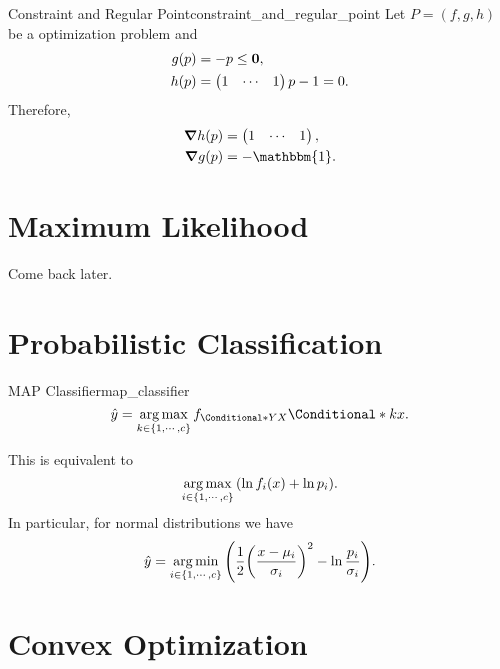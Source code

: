 \documentclass{article}
\begin{document}
\begin{example}{Constraint and Regular Point}{constraint_and_regular_point}
    Let $P = (f,g,h)$ be a optimization problem and
    \begin{align*}
        g(p) &= -p \le \vb{0}, \\
        h(p) &= \begin{pmatrix}
            1 & \cdots & 1
        \end{pmatrix} p - 1 = 0.
    \end{align*}
    Therefore,
    \begin{align*}
        \grad h(p) &= \begin{pmatrix}
            1 & \cdots & 1
        \end{pmatrix}, \\
        \grad g(p) &= -\mathbbm{1}.
    \end{align*}
\end{example}

\section{Maximum Likelihood}

Come back later.

\section{Probabilistic Classification}

\begin{definition}{MAP Classifier}{map_classifier}
    \[ \hat{y} = \argmax_{k\in\qty{1,\cdots,c}} f_{\Conditional*{Y}{X}}\Conditional*{k}{x}. \]
\end{definition}
This is equivalent to
\[ \operatorname*{arg\,max}_{i\in\qty{1,\cdots,c}} \qty(\ln f_i(x) + \ln p_i). \]
In particular, for normal distributions we have
\[ \hat{y} = \operatorname*{arg\,min}_{i\in\qty{1,\cdots,c}} \qty(\frac{1}{2}\qty(\frac{x - \mu_i}{\sigma_i})^2 - \ln \frac{p_i}{\sigma_i}). \]

\section{Convex Optimization}
\end{document}
